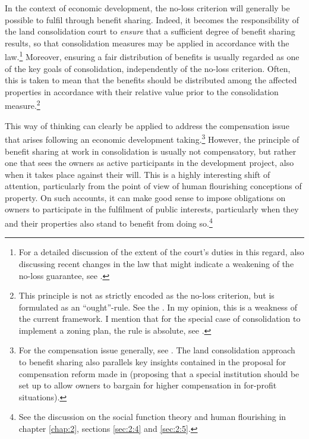 
In the context of economic development, the no-loss criterion will generally be possible to fulfil  through benefit sharing. Indeed, it becomes the responsibility of the land consolidation court to {\it ensure} that a sufficient degree of benefit sharing results, so that consolidation measures may be applied in accordance with the law.\footnote{For a detailed discussion of the extent of the court's duties in this regard, also discussing recent changes in the law that might indicate a weakening of the no-loss guarantee, see \cite{hauge15}.} Moreover, ensuring a fair distribution of benefits is usually regarded as one of the key goals of consolidation, independently of the no-loss criterion. Often, this is taken to mean that the benefits should be distributed among the affected properties in accordance with their relative value prior to the consolidation measure.\footnote{This principle is not as strictly encoded as the no-loss criterion, but is formulated as an ``ought''-rule. See the \dni\cite[31|41]{lca79}. In my opinion, this is a weakness of the current framework. I mention that for the special case of consolidation to implement a zoning plan, the rule is absolute, see \dni\cite[3 b)]{lca79}.}

This way of thinking can clearly be applied to address the compensation issue that arises following an  economic development taking.\footnote{For the compensation issue generally, see \cite{fennel04,bell07}. The land consolidation approach to benefit sharing also parallels key insights contained in the proposal for compensation reform made in \cite{lehavi07} (proposing that a special institution should be set up to allow owners to bargain for higher compensation in for-profit situations).} However, the principle of benefit sharing at work in consolidation is usually not compensatory, but rather one that sees the owners as active participants in the development project, also when it takes place against their will. This is a highly interesting shift of attention, particularly from the point of view of human flourishing conceptions of property. On such accounts, it can make good sense to impose obligations on owners to participate in the fulfilment of public interests, particularly when they and their properties also stand to benefit from doing so.\footnote{See the discussion on the social function theory and human flourishing in chapter \ref{chap:2}, sections \ref{sec:2:4} and \ref{sec:2:5}.}

